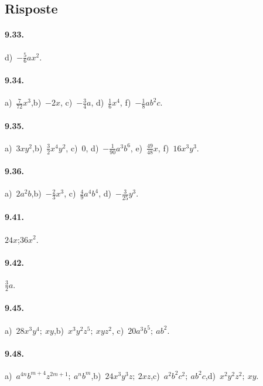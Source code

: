 \subsection{Risposte}

\paragraph{9.33.} d)~$-\frac{5}{6}ax^{2}$.
\paragraph{9.34.} a)~$\frac{7}{72}x^{3}$,\quad b)~$-2x$, \quad c)~$-\frac{3}{4}a$, \quad d)~$\frac{1}{6}x^{4}$, \quad f)~$-\frac{1}{8}ab^{2}c$.
\paragraph{9.35.} a)~$3xy^{2}$,\quad b)~$\frac{3}{2}x^{4}y^{2}$, \quad c)~0, \quad d)~$-\frac{1}{90}a^{3}b^{6}$, \quad e)~$\frac{49}{48}x$, \quad f)~$16x^{3}y^{3}$.
\paragraph{9.36.} a)~$2a^{2}b$,\quad b)~$-\frac{2}{3}x^{3}$, \quad c)~$\frac{4}{9}a^{4}b^{4}$, \quad d)~$-\frac{3}{25}y^{3}$.
\paragraph{9.41.} $24x$;\:$36x^2$.
\paragraph{9.42.} $\frac{3}{2}a$.
\paragraph{9.45.} a)~$28x^{3}y^{4};\:xy$,\quad b)~$x^{3}y^{2}z^{5};\:xyz^{2}$, \quad c)~$20a^{3}b^{5};\:ab^{2}$.
\paragraph{9.48.} a)~$a^{4n}b^{m+4}z^{2m+1};\:a^{n}b^{m}$,\quad b)~$24x^{3}y^{3}z;\:2xz$,\quad c)~$a^{2}b^{2}c^{2};\:ab^{2}c$,\quad d)~$x^{2}y^{2}z^{2};\:xy$.
